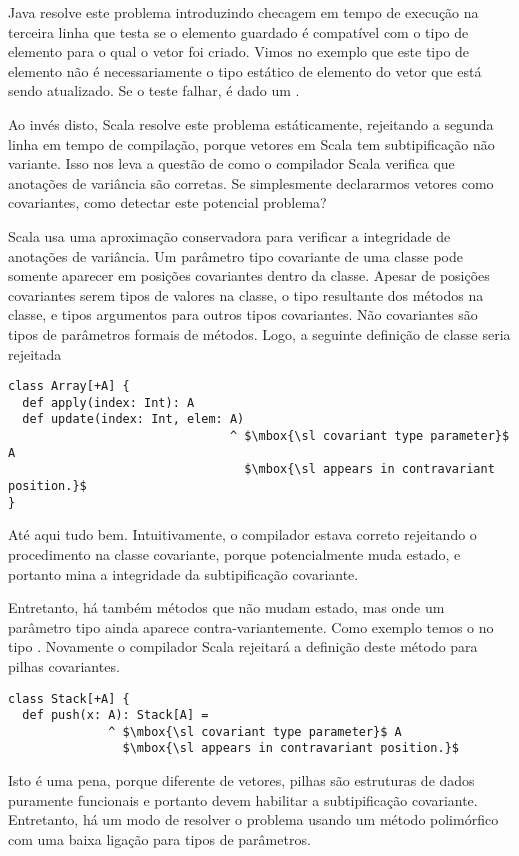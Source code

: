 Java resolve este problema introduzindo checagem em tempo de execução na 
terceira linha que testa se o elemento guardado é compatível com o tipo
de elemento para o qual o vetor foi criado. Vimos no exemplo que este 
tipo de elemento não é necessariamente o tipo estático de elemento do 
vetor que está sendo atualizado. Se o teste falhar, é dado um 
.

Ao invés disto, Scala resolve este problema estáticamente, rejeitando a
segunda linha em tempo de compilação, porque vetores em Scala tem 
subtipificação não variante. Isso nos leva a questão de como o 
compilador Scala verifica que anotações de variância são corretas.
Se simplesmente declararmos vetores como covariantes, como detectar
este potencial problema?

Scala usa uma aproximação conservadora para verificar a integridade de
anotações de variância. Um parâmetro tipo covariante de uma classe pode 
somente aparecer em posições covariantes dentro da classe. Apesar de
posições covariantes serem tipos de valores na classe, o tipo resultante
dos métodos na classe, e tipos argumentos para outros tipos covariantes. 
Não covariantes são tipos de parâmetros formais de métodos. Logo, a seguinte 
definição de classe seria rejeitada
\begin{lstlisting}
class Array[+A] {
  def apply(index: Int): A
  def update(index: Int, elem: A)
                               ^ $\mbox{\sl covariant type parameter}$ A
                                 $\mbox{\sl appears in contravariant position.}$
}
\end{lstlisting}

Até aqui tudo bem. Intuitivamente, o compilador estava correto rejeitando o 
procedimento  na classe covariante, porque  potencialmente 
muda estado, e portanto mina a integridade da subtipificação covariante.

Entretanto, há também métodos que não mudam estado, mas onde um parâmetro tipo ainda
aparece contra-variantemente. Como exemplo temos o  no tipo . 
Novamente o compilador Scala rejeitará a definição deste método para pilhas covariantes.


\begin{lstlisting}
class Stack[+A] {
  def push(x: A): Stack[A] =
              ^ $\mbox{\sl covariant type parameter}$ A
                $\mbox{\sl appears in contravariant position.}$
\end{lstlisting}

Isto é uma pena, porque diferente de vetores, pilhas são estruturas de dados 
puramente funcionais e portanto devem habilitar a subtipificação covariante. 
Entretanto,  há um modo de resolver o problema usando um método polimórfico
com uma baixa ligação para tipos de parâmetros. 


